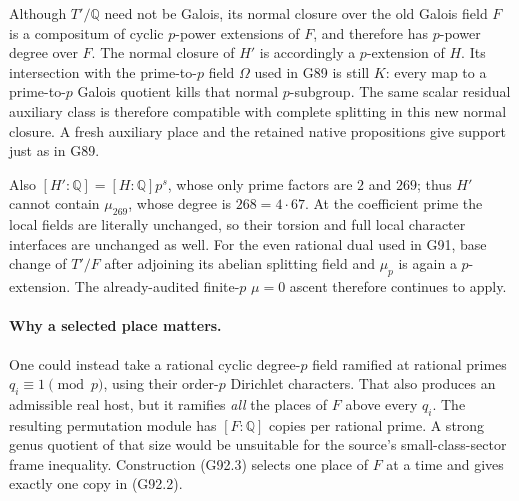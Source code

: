 Although \(T'/\mathbb Q\) need not be Galois, its normal closure
over the old Galois field \(F\) is a compositum of cyclic
\(p\)-power extensions of \(F\), and therefore has \(p\)-power
degree over \(F\).  The normal closure of \(H'\) is accordingly
a \(p\)-extension of \(H\).  Its intersection with the
prime-to-\(p\) field \(\Omega\) used in G89 is still \(K\):
every map to a prime-to-\(p\) Galois quotient kills that normal
\(p\)-subgroup.  The same scalar residual auxiliary class is
therefore compatible with complete splitting in this new normal
closure.  A fresh auxiliary place and the retained native
propositions give support just as in G89.

Also \([H':\mathbb Q]=[H:\mathbb Q]p^s\), whose only prime
factors are \(2\) and \(269\); thus \(H'\) cannot contain
\(\mu_{269}\), whose degree is \(268=4\cdot67\).
At the coefficient prime the local fields are literally unchanged,
so their torsion and full local character interfaces are unchanged
as well.
For the even rational dual used in G91, base change of
\(T'/F\) after adjoining its abelian splitting field and \(\mu_p\)
is again a \(p\)-extension.  The already-audited finite-\(p\)
\(\mu=0\) ascent therefore continues to apply.

\paragraph{Why a selected place matters.}
One could instead take a rational cyclic degree-\(p\) field ramified
at rational primes \(q_i\equiv1\pmod p\), using their order-\(p\)
Dirichlet characters.  That also produces an admissible real host,
but it ramifies \emph{all} the places of \(F\) above every \(q_i\).
The resulting permutation module has \([F:\mathbb Q]\) copies
per rational prime.  A strong genus quotient of that size would
be unsuitable for the source's small-class-sector frame inequality.
Construction (G92.3) selects one place of \(F\) at a time and gives
exactly one copy in (G92.2).

